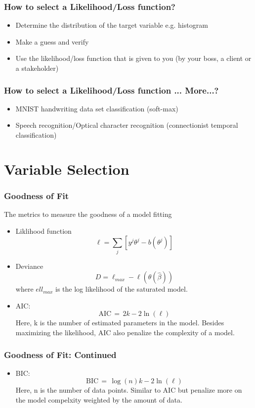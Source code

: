 \documentclass[notheorems, aspectratio=54, tikz,border=10pt,multi]{beamer}
\begin{document}
\begin{frame}
\frametitle{How to select a Likelihood/Loss function?}
\begin{itemize}
\item Determine the distribution of the target variable e.g. histogram
\item Make a guess and verify
\item Use the likelihood/loss function that is given to you (by your boss, a client or a stakeholder)
\end{itemize}
\end{frame}
\begin{frame}

\frametitle{How to select a Likelihood/Loss function ... More...?}
\begin{itemize}
\item MNIST handwriting data set classification (soft-max)
\item Speech recognition/Optical character recognition (connectionist temporal classification)
\end{itemize}

\end{frame}
\section{Variable Selection}

\begin{frame}
\frametitle{Goodness of Fit}

The metrics to measure the goodness of a model fitting
\begin{itemize}
\item Liklihood function$$\ell=\sum_{j} \left[y^j\theta^j-b(\theta^j)\right]$$

\item Deviance $$D=\ell_{max}-\ell(\theta (\hat{\beta}))$$ where $ell_{max}$ is the log likelihood of the saturated model.

\item AIC: $${\displaystyle \mathrm {AIC} \,=\,2k-2\ln({{\ell}})}$$
Here, k is the number of estimated parameters in the model. Besides maximizing the likelihood, AIC also penalize the complexity of a model.

\end{itemize}
\end{frame}

\begin{frame}
\frametitle{Goodness of Fit: Continued}
\begin{itemize}
\item BIC: $${\displaystyle \mathrm {BIC} \,=\,\log(n)k-2\ln({{\ell}})}$$
Here, n is the number of data points. Similar to AIC but penalize more on the model compelxity weighted by the amount of data.
\end{itemize}
\end{frame}
\end{document}
